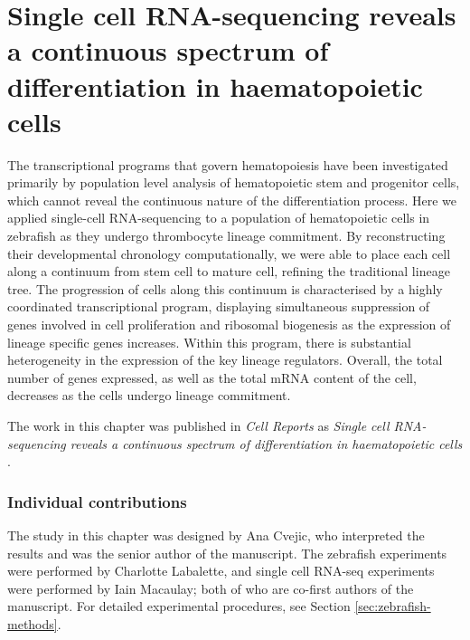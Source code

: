
\chapter{Single cell RNA-sequencing reveals a continuous spectrum of differentiation in haematopoietic cells}

\graphicspath{{Chapter3/Figs/}}

The transcriptional programs that govern hematopoiesis have been investigated primarily by population level analysis of hematopoietic stem and progenitor cells, which cannot reveal the continuous nature of the differentiation process. Here we applied single-cell RNA-sequencing to a population of hematopoietic cells in zebrafish as they undergo thrombocyte lineage commitment. By reconstructing their developmental chronology computationally, we were able to place each cell along a continuum from stem cell to mature cell, refining the traditional lineage tree. The progression of cells along this continuum is characterised by a highly coordinated transcriptional program, displaying simultaneous suppression of genes involved in cell proliferation and ribosomal biogenesis as the expression of lineage specific genes increases. Within this program, there is substantial heterogeneity in the expression of the key lineage regulators. Overall, the total number of genes expressed, as well as the total mRNA content of the cell, decreases as the cells undergo lineage commitment.

The work in this chapter was published in \textit{Cell Reports} as \textit{Single cell RNA-sequencing reveals a continuous spectrum of differentiation in haematopoietic cells} \cite{Macaulay2016-zd}.

\subsection*{Individual contributions}

The study in this chapter was designed by Ana Cvejic, who interpreted the results and was the senior author of the manuscript. The zebrafish experiments were performed by Charlotte Labalette, and single cell RNA-seq experiments were performed by Iain Macaulay; both of who are co-first authors of the manuscript. For detailed experimental procedures, see Section \ref{sec:zebrafish-methods}.

